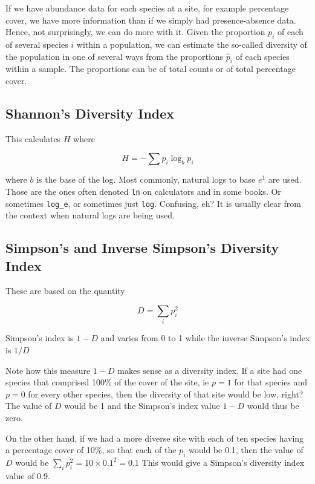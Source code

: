\documentclass[
  letterpaper,
  DIV=11,
  numbers=noendperiod]{scrreprt}
\begin{document}
If we have abundance data for each species at a site, for example
percentage cover, we have more information than if we simply had
presence-absence data. Hence, not surprisingly, we can do more with it.
Given the proportion \(p_i\) of each of several species \(i\) within a
population, we can estimate the so-called diversity of the population in
one of several ways from the proportions \(\hat p_i\) of each species
within a sample. The proportions can be of total counts or of total
percentage cover.

\subsection{Shannon's Diversity Index}\label{shannons-diversity-index}

This calculates \(H\) where

\[H=-\sum{p_i\log_b p_i}\]

where \(b\) is the base of the log. Most commonly, natural logs to base
\(e^1\) are used. Those are the ones often denoted \texttt{ln} on
calculators and in some books. Or sometimes \texttt{log\_e}, or
sometimes just \texttt{log}. Confusing, eh? It is usually clear from the
context when natural logs are being used.

\subsection{Simpson's and Inverse Simpson's Diversity
Index}\label{simpsons-and-inverse-simpsons-diversity-index}

These are based on the quantity

\[D=\sum_ip_i^2\]

Simpson's index is \(1-D\) and varies from 0 to 1 while the inverse
Simpson's index is \(1/D\)

Note how this measure \(1-D\) makes sense as a diversity index. If a
site had one species that comprised 100\% of the cover of the site, ie
\(p = 1\) for that species and \(p = 0\) for every other species, then
the diversity of that site would be low, right? The value of \(D\) would
be 1 and the Simpson's index value \(1-D\) would thus be zero.

On the other hand, if we had a more diverse site with each of ten
species having a percentage cover of 10\%, so that each of the \(p_i\)
would be 0.1, then the value of \(D\) would be
\(\sum_ip_i^2=10\times 0.1^2=0.1\) This would give a Simpson's diversity
index value of 0.9.
\end{document}
